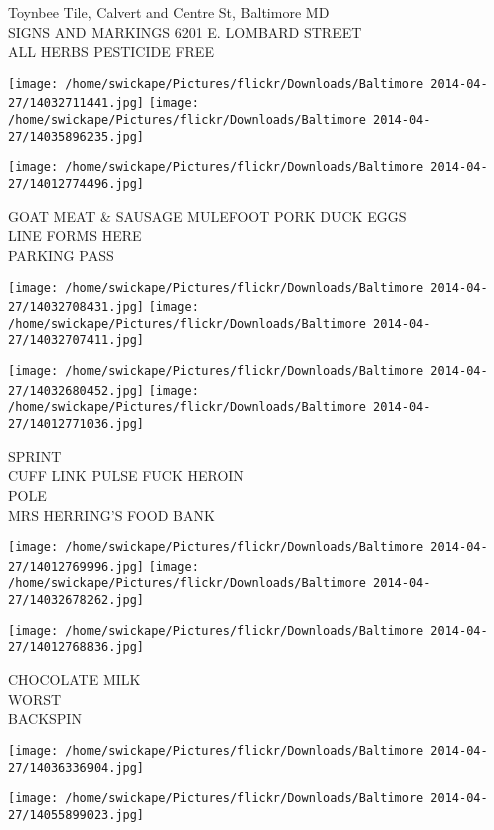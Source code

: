 \documentclass[10pt,letterpaper]{article}
\begin{document}
Toynbee Tile, Calvert and Centre St, Baltimore MD\\
SIGNS AND MARKINGS 6201 E. LOMBARD STREET\\
ALL HERBS PESTICIDE FREE
\pagebreak

\texttt{[image: /home/swickape/Pictures/flickr/Downloads/Baltimore 2014-04-27/14032711441.jpg]}
\texttt{[image: /home/swickape/Pictures/flickr/Downloads/Baltimore 2014-04-27/14035896235.jpg]}

\vspace{0.25in}
\texttt{[image: /home/swickape/Pictures/flickr/Downloads/Baltimore 2014-04-27/14012774496.jpg]}

GOAT MEAT \& SAUSAGE MULEFOOT PORK DUCK EGGS\\
LINE FORMS HERE\\
PARKING PASS
\pagebreak

\texttt{[image: /home/swickape/Pictures/flickr/Downloads/Baltimore 2014-04-27/14032708431.jpg]}
\texttt{[image: /home/swickape/Pictures/flickr/Downloads/Baltimore 2014-04-27/14032707411.jpg]}

\texttt{[image: /home/swickape/Pictures/flickr/Downloads/Baltimore 2014-04-27/14032680452.jpg]}
\texttt{[image: /home/swickape/Pictures/flickr/Downloads/Baltimore 2014-04-27/14012771036.jpg]}

SPRINT\\
CUFF LINK PULSE FUCK HEROIN\\
POLE\\
MRS HERRING'S FOOD BANK
\pagebreak

\texttt{[image: /home/swickape/Pictures/flickr/Downloads/Baltimore 2014-04-27/14012769996.jpg]}
\texttt{[image: /home/swickape/Pictures/flickr/Downloads/Baltimore 2014-04-27/14032678262.jpg]}

\texttt{[image: /home/swickape/Pictures/flickr/Downloads/Baltimore 2014-04-27/14012768836.jpg]}

CHOCOLATE MILK\\
WORST\\
BACKSPIN
\pagebreak

\texttt{[image: /home/swickape/Pictures/flickr/Downloads/Baltimore 2014-04-27/14036336904.jpg]}

\vspace{0.25in}
\texttt{[image: /home/swickape/Pictures/flickr/Downloads/Baltimore 2014-04-27/14055899023.jpg]}
\end{document}
